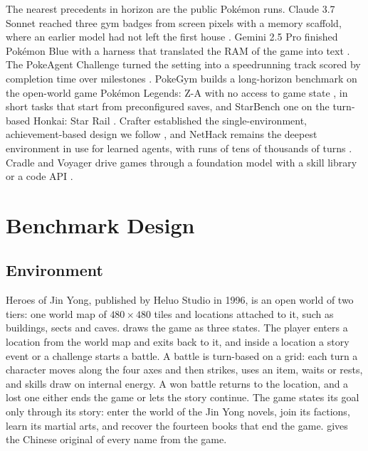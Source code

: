 \documentclass{article} %
\begin{document}
The nearest precedents in horizon are the public Pok\'emon runs. Claude 3.7 Sonnet reached three
gym badges from screen pixels with a memory scaffold, where an earlier
model had not left the first house \citep{anthropic2025pokemon}. Gemini 2.5
Pro finished Pok\'emon Blue with a harness that translated the
RAM of the game into text \citep{comanici2025gemini}. The PokeAgent Challenge turned the setting
into a speedrunning track scored by completion time over milestones
\citep{karten2026pokeagent}. PokeGym builds a long-horizon benchmark on the
open-world game Pok\'emon Legends: Z-A with no access to game state
\citep{zhang2026pokegym}, in short tasks that start from preconfigured saves, and StarBench one on the turn-based Honkai: Star
Rail \citep{zhang2025starbench}. Crafter established the single-environment,
achievement-based design we follow \citep{hafner2021benchmarking}, and
NetHack remains the deepest environment in use for learned agents, with runs of tens of thousands of turns \citep{kuttler2020nethack}. Cradle and Voyager drive games through a foundation model with a skill library or a code API \citep{tan2024cradle,wang2023voyager}.

\section{Benchmark Design}
\label{sec:bench}

\subsection{Environment}
\label{sec:env}

Heroes of Jin Yong, published by Heluo Studio in 1996, is an open world of two tiers: one world map of $480\times480$ tiles \citep{scarsty2026kyscpp} and \Mscenes{} locations attached to it, such as buildings, sects and caves.  draws the game as three states. The player enters a location from the world map and exits back to it, and inside a location a story event or a challenge starts a battle. A battle is turn-based on a grid: each turn a character moves along the four axes and then strikes, uses an item, waits or rests, and skills draw on internal energy. A won battle returns to the location, and a lost one either ends the game or lets the story continue. The game states its goal only through its story: enter the world of the Jin Yong novels, join its factions, learn its martial arts, and recover the fourteen books that end the game.  gives the Chinese original of every name from the game.
\end{document}
